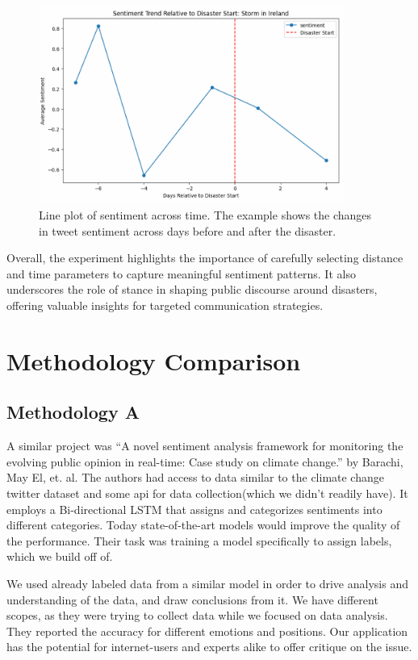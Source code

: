 \documentclass[pdflatex,sn-mathphys-num]{sn-jnl}%
\theoremstyle{thmstyleone}%
\theoremstyle{thmstyletwo}%
\theoremstyle{thmstylethree}%
\begin{document}
\begin{figure}[H]
\centering
\includegraphics[width=10cm]{images/climatechangepulse8.PNG}
\caption{Line plot of sentiment across time. The example shows the changes in tweet sentiment across days before and after the disaster.}
\end{figure}

Overall, the experiment highlights the importance of carefully selecting distance and time parameters to capture meaningful sentiment patterns. It also underscores the role of stance in shaping public discourse around disasters, offering valuable insights for targeted communication strategies.

\section{Methodology Comparison}\label{sec5}
\subsection{Methodology A}\label{subsec11}
A similar project was “A novel sentiment analysis framework for monitoring the evolving public opinion in real-time: Case study on climate change.” by Barachi, May El, et. al. The authors had access to data similar to the climate change twitter dataset and some api for data collection(which we didn’t readily have). It employs a Bi-directional LSTM that assigns and categorizes sentiments into different categories. Today state-of-the-art models would improve the quality of the performance. Their task was training a model specifically to assign labels, which we build off of.

We used already labeled data from a similar model in order to drive analysis and understanding of the data, and draw conclusions from it. We have different scopes, as they were trying to collect data while we focused on data analysis. They reported the accuracy for different emotions and positions. Our application has the potential for internet-users and experts alike to offer critique on the issue.
\end{document}
